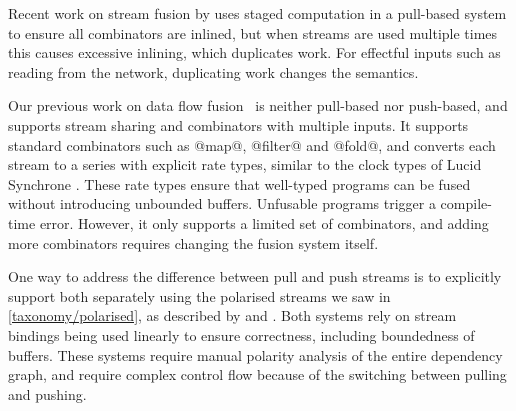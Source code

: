 Recent work on stream fusion by \citet{kiselyov2016stream} uses staged computation in a pull-based system to ensure all combinators are inlined, but when streams are used multiple times this causes excessive inlining, which duplicates work.
For effectful inputs such as reading from the network, duplicating work changes the semantics.

Our previous work on data flow fusion~\cite{lippmeier2013data} is neither pull-based nor push-based, and supports stream sharing and combinators with multiple inputs.
It supports standard combinators such as @map@, @filter@ and @fold@, and converts each stream to a series with explicit rate types, similar to the clock types of Lucid Synchrone \cite{benveniste2003synchronous}.
These rate types ensure that well-typed programs can be fused without introducing unbounded buffers.
Unfusable programs trigger a compile-time error.
However, it only supports a limited set of combinators, and adding more combinators requires changing the fusion system itself.

One way to address the difference between pull and push streams is to explicitly support both separately using the polarised streams we saw in \cref{taxonomy/polarised}, as described by \citet{bernardy2015duality} and \citet{lippmeier2016polarized}.
Both systems rely on stream bindings being used linearly to ensure correctness, including boundedness of buffers.
These systems require manual polarity analysis of the entire dependency graph, and require complex control flow because of the switching between pulling and pushing.

